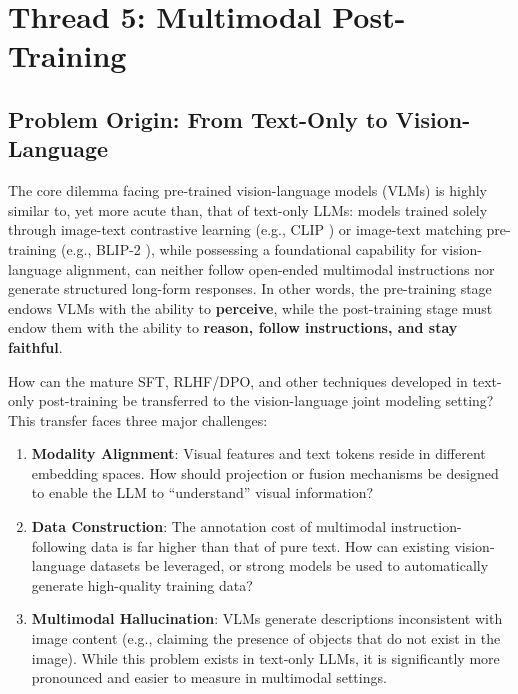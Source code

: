 \section{Thread 5: Multimodal Post-Training}
\label{sec:t5}

\subsection{Problem Origin: From Text-Only to Vision-Language}
\label{sec:t5-origin}

The core dilemma facing pre-trained vision-language models (VLMs) is highly similar to, yet more acute than, that of text-only LLMs:
models trained solely through image-text contrastive learning (e.g., CLIP \cite{radford2021clip}) or
image-text matching pre-training (e.g., BLIP-2 \cite{li2023blip2}),
while possessing a foundational capability for vision-language alignment,
can neither follow open-ended multimodal instructions nor generate structured long-form responses.
In other words, the pre-training stage endows VLMs with the ability to \textbf{perceive},
while the post-training stage must endow them with the ability to \textbf{reason, follow instructions, and stay faithful}.

\begin{problembox}
How can the mature SFT, RLHF/DPO, and other techniques developed in text-only post-training
be transferred to the vision-language joint modeling setting?
This transfer faces three major challenges:
\begin{enumerate}[leftmargin=2em]
  \item \textbf{Modality Alignment}:
    Visual features and text tokens reside in different embedding spaces.
    How should projection or fusion mechanisms be designed to enable the LLM to ``understand'' visual information?
  \item \textbf{Data Construction}:
    The annotation cost of multimodal instruction-following data is far higher than that of pure text.
    How can existing vision-language datasets be leveraged, or strong models be used to automatically generate high-quality training data?
  \item \textbf{Multimodal Hallucination}:
    VLMs generate descriptions inconsistent with image content (e.g., claiming the presence of objects that do not exist in the image).
    While this problem exists in text-only LLMs, it is significantly more pronounced and easier to measure in multimodal settings.
\end{enumerate}
\end{problembox}


